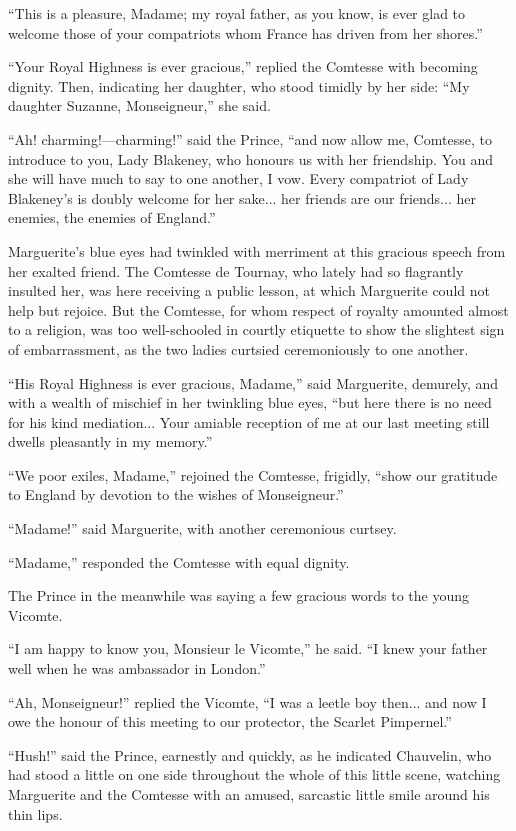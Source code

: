 \documentclass[paper=a5,BCOR=7mm,twoside,DIV=calc,12pt,usegeometry,chapterprefix,endperiod,headings=big]{scrbook}
\begin{document}
\enquote{This is a pleasure, Madame; my royal father, as you know, is ever glad to welcome those of your compatriots whom France has driven from her shores.}

\enquote{Your Royal Highness is ever gracious,} replied the Comtesse with becoming dignity. Then, indicating her daughter, who stood timidly by her side: \enquote{My daughter Suzanne, Monseigneur,} she said.

\enquote{Ah! charming!---charming!} said the Prince, \enquote{and now allow me, Comtesse, to introduce to you, Lady Blakeney, who honours us with her friendship. You and she will have much to say to one another, I vow. Every compatriot of Lady Blakeney's is doubly welcome for her sake... her friends are our friends... her enemies, the enemies of England.}

Marguerite's blue eyes had twinkled with merriment at this gracious speech from her exalted friend. The Comtesse de Tournay, who lately had so flagrantly insulted her, was here receiving a public lesson, at which Marguerite could not help but rejoice. But the Comtesse, for whom respect of royalty amounted almost to a religion, was too well-schooled in courtly etiquette to show the slightest sign of embarrassment, as the two ladies curtsied ceremoniously to one another.

\enquote{His Royal Highness is ever gracious, Madame,} said Marguerite, demurely, and with a wealth of mischief in her twinkling blue eyes, \enquote{but here there is no need for his kind mediation... Your amiable reception of me at our last meeting still dwells pleasantly in my memory.}

\enquote{We poor exiles, Madame,} rejoined the Comtesse, frigidly, \enquote{show our gratitude to England by devotion to the wishes of Monseigneur.}

\enquote{Madame!} said Marguerite, with another ceremonious curtsey.

\enquote{Madame,} responded the Comtesse with equal dignity.

The Prince in the meanwhile was saying a few gracious words to the young Vicomte.

\enquote{I am happy to know you, Monsieur le Vicomte,} he said. \enquote{I knew your father well when he was ambassador in London.}

\enquote{Ah, Monseigneur!} replied the Vicomte, \enquote{I was a leetle boy then... and now I owe the honour of this meeting to our protector, the Scarlet Pimpernel.}

\enquote{Hush!} said the Prince, earnestly and quickly, as he indicated Chauvelin, who had stood a little on one side throughout the whole of this little scene, watching Marguerite and the Comtesse with an amused, sarcastic little smile around his thin lips.
\end{document}
